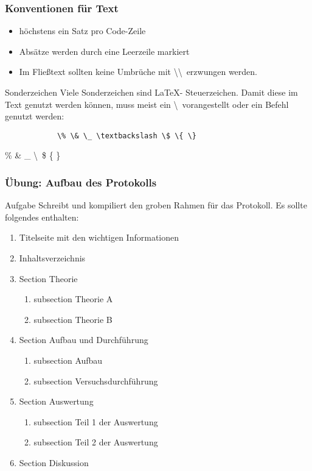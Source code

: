 \begin{frame}[fragile]
    \frametitle{Konventionen für Text}
    \begin{itemize}
        \item höchstens ein Satz pro Code-Zeile
        \item Absätze werden durch eine Leerzeile markiert
        \item Im Fließtext sollten keine Umbrüche mit \textbackslash\textbackslash \  erzwungen werden.
    \end{itemize}
    \begin{alertblock}{Sonderzeichen}
        Viele Sonderzeichen sind \LaTeX- Steuerzeichen. Damit diese im Text genutzt werden können,
        muss meist ein \textbackslash \ vorangestellt oder ein Befehl genutzt werden:
        \begin{center}
            \begin{lstlisting}
            \% \& \_ \textbackslash \$ \{ \}
            \end{lstlisting}
            \% \& \_ \textbackslash \ \$ \{ \}
        \end{center}
    \end{alertblock}
\end{frame}
\begin{frame}
    \frametitle{Übung: Aufbau des Protokolls}
    \begin{block}{Aufgabe}
        Schreibt und kompiliert den groben Rahmen für das Protokoll.
        Es sollte folgendes enthalten:
        \begin{enumerate}
            \item Titelseite mit den wichtigen Informationen
            \item Inhaltsverzeichnis
            \item Section Theorie
                \begin{enumerate}
                    \item subsection Theorie A
                    \item subsection Theorie B
                \end{enumerate}
            \item Section Aufbau und Durchführung
                \begin{enumerate}
                    \item subsection Aufbau
                    \item subsection Versuchsdurchführung
                \end{enumerate}
            \item Section Auswertung
                \begin{enumerate}
                    \item subsection Teil 1 der Auswertung
                    \item subsection Teil 2 der Auswertung
                \end{enumerate}
            \item Section Diskussion
        \end{enumerate}
    \end{block}
\end{frame}

